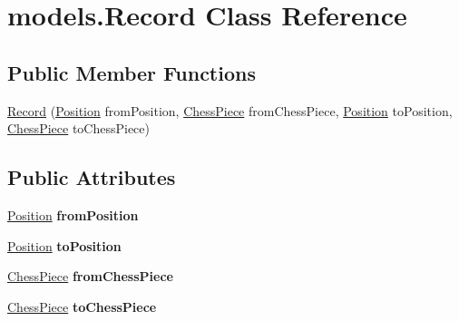 \hypertarget{classmodels_1_1_record}{\section{models.\+Record Class Reference}
\label{classmodels_1_1_record}
}
\subsection*{Public Member Functions}
\begin{DoxyCompactItemize}
\item 
\hyperlink{classmodels_1_1_record_aab11b9bfb04e143b8724bf70f2281d7b}{Record} (\hyperlink{classmodels_1_1_position}{Position} from\+Position, \hyperlink{classchess_pieces_1_1_chess_piece}{Chess\+Piece} from\+Chess\+Piece, \hyperlink{classmodels_1_1_position}{Position} to\+Position, \hyperlink{classchess_pieces_1_1_chess_piece}{Chess\+Piece} to\+Chess\+Piece)
\end{DoxyCompactItemize}
\subsection*{Public Attributes}
\begin{DoxyCompactItemize}
\item 
\hypertarget{classmodels_1_1_record_a32fe7113a48e4e8aec6f42df17534c8f}{\hyperlink{classmodels_1_1_position}{Position} {\bfseries from\+Position}}\label{classmodels_1_1_record_a32fe7113a48e4e8aec6f42df17534c8f}

\item 
\hypertarget{classmodels_1_1_record_a7988f40013f55853bf480087e363b4c7}{\hyperlink{classmodels_1_1_position}{Position} {\bfseries to\+Position}}\label{classmodels_1_1_record_a7988f40013f55853bf480087e363b4c7}

\item 
\hypertarget{classmodels_1_1_record_aec34b5532a1db3589d7358f0f8d5f067}{\hyperlink{classchess_pieces_1_1_chess_piece}{Chess\+Piece} {\bfseries from\+Chess\+Piece}}\label{classmodels_1_1_record_aec34b5532a1db3589d7358f0f8d5f067}

\item 
\hypertarget{classmodels_1_1_record_a1f068693f9cfee54d43bd50f323ac420}{\hyperlink{classchess_pieces_1_1_chess_piece}{Chess\+Piece} {\bfseries to\+Chess\+Piece}}\label{classmodels_1_1_record_a1f068693f9cfee54d43bd50f323ac420}

\end{DoxyCompactItemize}


